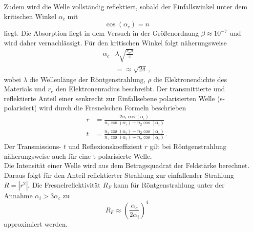 Zudem wird die Welle vollständig reflektiert, sobald der Einfallswinkel unter dem kritischen Winkel $\alpha_c$ mit
\begin{equation*}
    \cos \left ( \alpha_c \right ) = n
\end{equation*}
liegt.
Die Absorption liegt in dem Versuch in der Größenordnung $\beta \approx 10^{-7}$ und wird daher vernachlässigt.
Für den kritischen Winkel folgt näherungsweise
\begin{align}
    \alpha_c &\lambda \sqrt{\frac{r_e \rho}{\pi}} \label{eqn:kritisch_th}\\
    &= \approx \sqrt{2 \delta} \label{eqn:kritisch_exp} \, ,
\end{align}
wobei $\lambda$ die Wellenlänge der Röntgenstrahlung, $\rho$ die Elektronendichte des Materials und $r_e$ den Elektronenradius beschreibt.
Der transmittierte und reflektierte Anteil einer senkrecht zur Einfallsebene polarisierten Welle (s-polarisiert) wird durch die Fresnelschen Formeln beschrieben
\begin{align}
    r &= \frac{2 n_1 \cos \left( \alpha_i \right)}{n_1 \cos \left( \alpha_i \right ) + n_2 \cos \left( \alpha_t \right )} \label{eqn:fresnel_r} \\
    t &= \frac{n_1 \cos \left( \alpha_i \right ) - n_2 \cos \left( \alpha_t \right )}{n_1 \cos \left( \alpha_i \right ) + n_2 \cos \left( \alpha_t \right )} \, . \label{eqn:fresnel_t}
\end{align}
Der Transmissions- $t$ und Reflexionskoeffizient $r$ gilt bei Röntgenstrahlung näherungsweise auch für eine t-polarisierte Welle.
\\
Die Intensität einer Welle wird aus dem Betragsquadrat der Feldstärke berechnet. 
Daraus folgt für den Anteil reflektierter Strahlung zur einfallender Strahlung $R = |r^2|$.
Die Fresnelreflektivität $R_F$ kann für Röntgenstrahlung unter der Annahme $\alpha_i > 3 \alpha_c$ zu
\begin{equation}
    R_F \approx \left ( \frac{\alpha_c}{2 \alpha_i} \right )^4
    \label{eqn:fresnelreflektivitaet}
\end{equation}
approximiert werden.
\FloatBarrier

